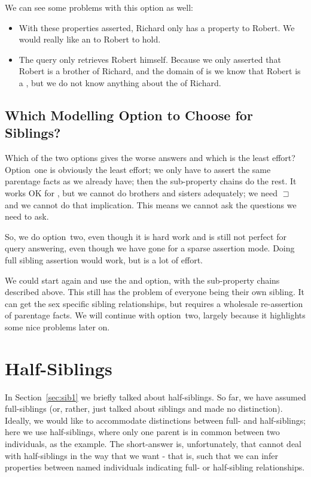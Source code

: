 We can see some problems with this option as well:
\begin{itemize}
\item With these properties asserted, Richard only has a  property to Robert. We would really like an  to Robert to hold.
\item The query  only retrieves Robert himself. Because we only asserted that Robert is a brother of Richard, and the domain of  is  we know that Robert is a , but we do not know anything about the  of Richard.
\end{itemize}

\subsection{Which Modelling Option to Choose for Siblings?}

Which of the two options gives the worse answers and which is the least effort? Option~one is obviously the least effort; we only have to assert the same parentage facts as we already have; then the sub-property chains do the rest. It works OK for , but we cannot do brothers and sisters adequately; we need \man {} $\sqsupset$  and we cannot do that implication. This means we cannot ask the questions we need to ask.\herebedragons

So, we do option~two, even though it is hard work and is still not perfect for query answering, even though we have gone for a sparse assertion mode. Doing full sibling assertion would work, but is a lot of effort.

We could start again and use the  and  option, with the sub-property chains described above. This still has the problem of everyone being their own sibling. It can get the sex specific sibling relationships, but requires a wholesale re-assertion of parentage facts. We will continue with option~two, largely because it highlights some nice problems later on.

\section{Half-Siblings}
In Section~\ref{sec:sib1} we briefly talked about half-siblings. So far, we have assumed full-siblings (or, rather, just talked about siblings and made no distinction). Ideally, we would like to accommodate distinctions between full- and half-siblings; here we use half-siblings, where only one parent is in common between two individuals, as the example. The short-answer is, unfortunately, that \owlii cannot deal with half-siblings in the way that we want - that is, such that we can infer properties between named individuals indicating full- or half-sibling relationships.

